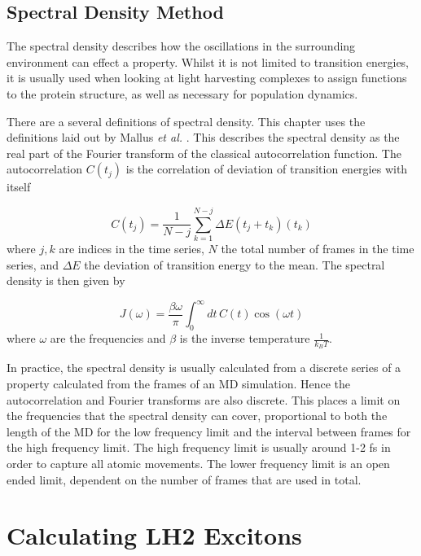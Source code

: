 \subsection{Spectral Density Method}
\label{subsec:spec_dens}

The spectral density describes how the oscillations in the surrounding environment 
can effect a property. Whilst it is not limited to transition energies, it is usually
used when looking at light harvesting complexes to assign functions to the protein
structure, as well as necessary for population dynamics.

There are a several definitions of spectral density. This chapter uses the definitions
laid out by Mallus \emph{et al.} \cite{Mallus2018}. This describes the spectral density
as the real part of the Fourier transform of the classical autocorrelation function.
The autocorrelation $C\left(t_j\right)$ is the correlation of deviation of transition
energies with itself

\begin{equation}
    C\left(t_j\right) = \frac{1}{N-j} \sum^{N-j}_{k=1} \Delta E \left(t_j + t_k\right) \left(t_k\right)
\end{equation}
%
where $j,k$ are indices in the time series, $N$ the total number of frames in the
time series, and $\Delta E$ the deviation of transition energy to the mean. The
spectral density is then given by

\begin{equation}
    J\left(\omega\right) = \frac{\beta \omega}{\pi} \int^\infty_0 dt \, C\left(t\right) \cos \left(\omega t\right)
\end{equation}
%
where $\omega$ are the frequencies and $\beta$ is the inverse temperature $\frac{1}{k_B T}$.

In practice, the spectral density is usually calculated from a discrete series of 
a property calculated from the frames of an MD simulation. Hence the autocorrelation
and Fourier transforms are also discrete. This places a limit on the frequencies 
that the spectral density can cover, proportional to both the length of the MD
for the low frequency limit and the interval between frames for the high frequency
limit. The high frequency limit is usually around 1-2 fs in order to capture all
atomic movements. The lower frequency limit is an open ended limit, dependent on
the number of frames that are used in total.

\section{Calculating LH2 Excitons}
\label{sec:MD}

